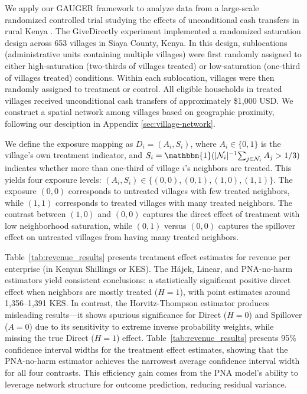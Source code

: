 \documentclass{article}
\theoremstyle{plain}
\theoremstyle{definition}
\theoremstyle{remark}
\newcommand{\cN}{\mathcal{N}}
\newcommand{\indicator}{\mathbbm{1}}
\begin{document}
We apply our GAUGER framework to analyze data from a large-scale randomized controlled trial studying the effects of unconditional cash transfers in rural Kenya \citep{egger2022general}. The GiveDirectly experiment implemented a randomized saturation design across 653 villages in Siaya County, Kenya. In this design, sublocations (administrative units containing multiple villages) were first randomly assigned to either high-saturation (two-thirds of villages treated) or low-saturation (one-third of villages treated) conditions. Within each sublocation, villages were then randomly assigned to treatment or control. All eligible households in treated villages received unconditional cash transfers of approximately \$1,000 USD. We construct a spatial network among villages based on geographic proximity, following our desciption in Appendix \ref{sec:village-network}.

We define the exposure mapping as $D_i = (A_i, S_i)$, where $A_i \in \{0, 1\}$ is the village's own treatment indicator, and $S_i = \indicator({|\cN_i|^{-1}}{\sum_{j \in \cN_i} A_j} > {1}/{3})$ indicates whether more than one-third of village $i$'s neighbors are treated. This yields four exposure levels: $(A_i, S_i) \in \{(0,0), (0,1), (1,0), (1,1)\}$. The exposure $(0,0)$ corresponds to untreated villages with few treated neighbors, while $(1,1)$ corresponds to treated villages with many treated neighbors. The contrast between $(1,0)$ and $(0,0)$ captures the direct effect of treatment with low neighborhood saturation, while $(0,1)$ versus $(0,0)$ captures the spillover effect on untreated villages from having many treated neighbors.






Table~\ref{tab:revenue_results} presents treatment effect estimates for revenue per enterprise (in Kenyan Shillings or KES). The H\'{a}jek, Linear, and PNA-no-harm estimators yield consistent conclusions: a statistically significant positive direct effect when neighbors are mostly treated ($H=1$), with point estimates around 1,356--1,391 KES. In contrast, the Horvitz-Thompson estimator produces misleading results---it shows spurious significance for Direct ($H=0$) and Spillover ($A=0$) due to its sensitivity to extreme inverse probability weights, while missing the true Direct ($H=1$) effect. Table~\ref{tab:revenue_results} presents 95\% confidence interval widths for the treatment effect estimates, showing that the PNA-no-harm estimator achieves the narrowest average confidence interval width for all four contrasts. This efficiency gain comes from the PNA model's ability to leverage network structure for outcome prediction, reducing residual variance.
\end{document}
